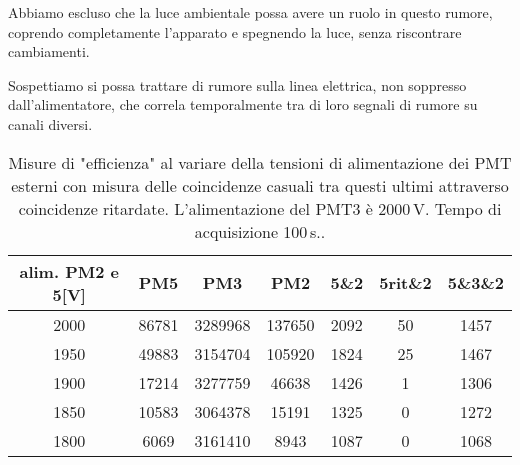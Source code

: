 Abbiamo escluso che la luce ambientale possa avere un ruolo in questo rumore, coprendo completamente l'apparato e spegnendo la luce, senza riscontrare cambiamenti.

Sospettiamo si possa trattare di rumore sulla linea elettrica, non soppresso dall'alimentatore, che correla temporalmente tra di loro segnali di rumore su canali diversi.

\begin{table}
\centering
\begin{tabular}{c|c|c|c|c|c|c}
\hline
alim. PM2 e 5[V] & PM5 & PM3 & PM2 & 5\&2 & 5rit\&2 & 5\&3\&2 \\
\hline
2000 & 86781 & 3289968 & 137650 & 2092 & 50 & 1457 \\
1950 & 49883 & 3154704 & 105920 & 1824 & 25 & 1467 \\
1900 & 17214 & 3277759 & 46638 & 1426 & 1 & 1306 \\
1850 & 10583 & 3064378 & 15191 & 1325 & 0 & 1272 \\
1800 & 6069 & 3161410 & 8943 & 1087 & 0 & 1068 \\
\hline
\end{tabular}
\caption{Misure di "efficienza" al variare della tensioni di alimentazione dei PMT esterni con misura delle coincidenze casuali tra questi ultimi attraverso coincidenze ritardate. L'alimentazione del PMT3 è 2000\,V. Tempo di acquisizione 100\,s..}
\label{orrore}
\end{table}